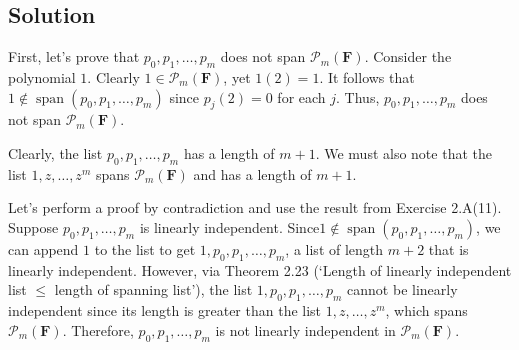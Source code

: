 \documentclass{article}
\begin{document}
\subsection*{Solution}
First, let's prove that $p_0,p_1,\ldots,p_m$ does not span $\mathcal{P}_m(\mathbf{F})$. 
Consider the polynomial $1$. 
Clearly $1\in\mathcal{P}_m(\mathbf{F})$, yet $1(2)=1$. 
It follows that $1\notin\operatorname{span}(p_0,p_1,\ldots,p_m)$ since $p_j(2)=0$ for each $j$. 
Thus, $p_0,p_1,\ldots,p_m$ does not span $\mathcal{P}_m(\mathbf{F})$. 

Clearly, the list $p_0,p_1,\ldots,p_m$ has a length of $m+1$. 
We must also note that the list $1,z,\ldots,z^m$ spans $\mathcal{P}_m(\mathbf{F})$ and has a length of $m+1$.

Let's perform a proof by contradiction and use the result from Exercise 2.A(11). 
Suppose $p_0,p_1,\ldots,p_m$ is linearly independent. 
Since\newline $1\notin\operatorname{span}(p_0,p_1,\ldots,p_m)$, we can append $1$ to the list to get $1,p_0,p_1,\ldots,p_m$, a list of length $m+2$ that is linearly independent. 
However, via Theorem 2.23 (`Length of linearly independent list $\leq$ length of spanning list'), the list $1,p_0,p_1,\ldots,p_m$ cannot be linearly independent since its length is greater than the list $1,z,\ldots,z^m$, which spans $\mathcal{P}_m(\mathbf{F})$. 
Therefore, $p_0,p_1,\ldots,p_m$ is not linearly independent in $\mathcal{P}_m(\mathbf{F})$.
\end{document}
